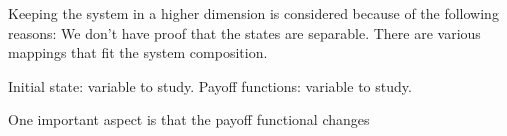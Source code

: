 Keeping the system in a higher dimension is considered because of the following reasons: We don't have proof that the states are separable. There are various mappings that fit the system composition. 


Initial state: variable to study.
Payoff functions: variable to study.

\begin{emph}


One important aspect is that the payoff functional changes


\end{emph}